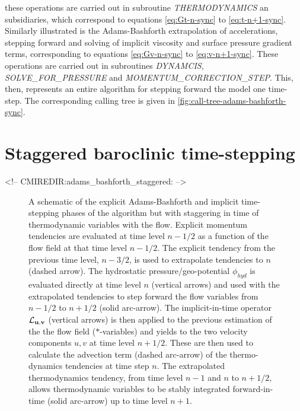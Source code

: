 these operations are carried out in subroutine {\em THERMODYNAMICS} an
subsidiaries, which correspond to equations \ref{eq:Gt-n-sync} to
\ref{eq:t-n+1-sync}.
Similarly illustrated is the Adams-Bashforth extrapolation of
accelerations, stepping forward and solving of implicit viscosity and
surface pressure gradient terms, corresponding to equations
\ref{eq:Gv-n-sync} to \ref{eq:v-n+1-sync}.
These operations are carried out in subroutines {\em DYNAMCIS}, {\em
SOLVE\_FOR\_PRESSURE} and {\em MOMENTUM\_CORRECTION\_STEP}. This, then,
represents an entire algorithm for stepping forward the model one
time-step. The corresponding calling tree is given in
\ref{fig:call-tree-adams-bashforth-sync}.

\section{Staggered baroclinic time-stepping}
\label{sect:adams-bashforth-staggered}
\begin{rawhtml}
<!-- CMIREDIR:adams_bashforth_staggered: -->
\end{rawhtml}

\begin{figure}
\begin{center}
\end{center}
\caption{
A schematic of the explicit Adams-Bashforth and implicit time-stepping
phases of the algorithm but with staggering in time of thermodynamic
variables with the flow. 
Explicit momentum tendencies are evaluated at time level $n-1/2$ as a 
function of the flow field at that time level $n-1/2$.
The explicit tendency from the previous time level, $n-3/2$, is used to
extrapolate tendencies to $n$ (dashed arrow). 
The hydrostatic pressure/geo-potential $\phi_{hyd}$ is evaluated directly 
at time level $n$ (vertical arrows) and used with the extrapolated tendencies
to step forward the flow variables from $n-1/2$ to $n+1/2$ (solid arc-arrow).
The implicit-in-time operator ${\cal L}_{\bf u,v}$ (vertical arrows) is 
then applied to the previous estimation of the the flow field ($*$-variables) 
and yields to the two velocity components $u,v$ at time level $n+1/2$. 
These are then used to calculate the advection term (dashed arc-arrow) 
of the thermo-dynamics tendencies at time step $n$.
The extrapolated thermodynamics tendency, from time level $n-1$ and $n$ 
to $n+1/2$, allows thermodynamic variables to be stably integrated 
forward-in-time (solid arc-arrow) up to time level $n+1$.
}
\label{fig:adams-bashforth-staggered}
\end{figure}

